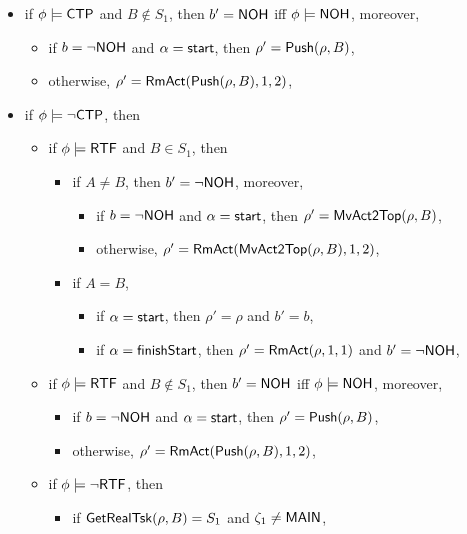 \begin{itemize}
\begin{itemize}
\begin{itemize}
\begin{itemize}
\begin{itemize}
\begin{itemize}
\begin{itemize}
					\end{itemize}
				\end{itemize}
				\item if $\phi \models {\sf CTP}$ and $B\notin S_1$, then $b' = {\sf NOH}$ iff $\phi \models {\sf NOH}$, moreover,
				\begin{itemize}
					\item if $b = \neg {\sf NOH}$ and $\alpha = {\mathsf{start} }$, then $\rho'=\mathsf{Push}(\rho, B)$,
					\item otherwise, $\rho' = \mathsf{RmAct}(\mathsf{Push}(\rho, B), 1, 2)$, 
				\end{itemize}
				\item if $\phi \models \neg {\sf CTP}$, then
				\begin{itemize}
					\item if $\phi \models {\sf RTF}$ and $B \in S_1$, then
					\begin{itemize}
						\item if $A \neq B$, then $b' = \neg {\sf NOH}$, moreover, 
						\begin{itemize}
							\item if $b = \neg {\sf NOH}$ and $\alpha = {\mathsf{start} }$, then $\rho'=\mathsf{MvAct2Top}(\rho, B)$,
							\item otherwise, $\rho' = \mathsf{RmAct}(\mathsf{MvAct2Top}(\rho, B), 1, 2)$,
						\end{itemize}
						\item if $A = B$, 
						\begin{itemize}
							\item if $\alpha = {\mathsf{start} }$, then $\rho' = \rho$ and $b' = b$,
							\item if $\alpha = {\mathsf{finishStart} }$, then $\rho' = \mathsf{RmAct}(\rho, 1, 1)$ and $b' = \neg{\sf NOH}$,
						\end{itemize}
					\end{itemize}
					\item if $\phi \models {\sf RTF}$ and $B \notin S_1$, then $b' = {\sf NOH}$ iff $\phi \models {\sf NOH}$, moreover,
					\begin{itemize}
						\item if $b = \neg {\sf NOH}$ and $\alpha = {\mathsf{start} }$, then $\rho'=\mathsf{Push}(\rho, B)$,
						\item otherwise, $\rho' = \mathsf{RmAct}(\mathsf{Push}(\rho, B), 1, 2)$, 
					\end{itemize}
					\item if $\phi \models \neg {\sf RTF}$, then
					\begin{itemize}
						\item if $\mathsf{GetRealTsk}(\rho,B) = S_1$ and $\zeta_1 \neq {\sf MAIN}$, 

\end{itemize}
\end{itemize}
\end{itemize}
\end{itemize}
\end{itemize}
\end{itemize}
\end{itemize}
